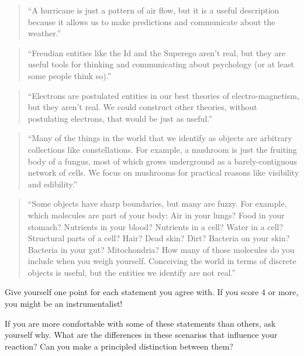 \documentclass[10pt]{book}
\begin{document}
\begin{quote}
``A hurricane is just a pattern of air flow, but it is a useful
  description because it allows us to make predictions and communicate
  about the weather.''
\end{quote}

\begin{quote}
``Freudian entities like the Id and the Superego aren't real, but they
  are useful tools for thinking and communicating about psychology (or
  at least some people think so).''
\end{quote}

\begin{quote}
``Electrons are postulated entities in our best theories of
electro-magnetism, but they aren't real.  We could construct
other theories, without postulating electrons, that would be
just as useful.''
\end{quote}

\begin{quote}
``Many of the things in the world that we identify as objects are
  arbitrary collections like constellations.  For example, a mushroom
  is just the fruiting body of a fungus, most of which grows
  underground as a barely-contiguous network of cells.  We focus
  on mushrooms for practical reasons like visibility and edibility.''
\end{quote}

\begin{quote}
``Some objects have sharp boundaries, but many are fuzzy.  For
  example, which molecules are part of your body: Air in your lungs?
  Food in your stomach?  Nutrients in your blood?  Nutrients in a
  cell?  Water in a cell?  Structural parts of a cell?  Hair?  Dead
  skin?  Dirt?  Bacteria on your skin?  Bacteria in your gut?
  Mitochondria?  How many of those molecules do you include when you
  weigh yourself.  Conceiving the world in terms of discrete objects
  is useful, but the entities we identify are not real.''
\end{quote}

Give yourself one point for each statement you agree with.
If you score 4 or more, you might be an instrumentalist!

If you are more comfortable with some of these statements than
others, ask yourself why.  What are the differences in these
scenarios that influence your reaction?  Can you make
a principled distinction between them?
\end{document}
